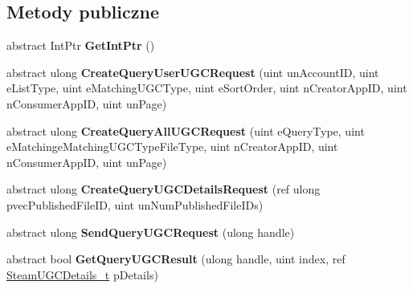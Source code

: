 \subsection*{Metody publiczne}
\begin{DoxyCompactItemize}
\item 
\mbox{\label{class_valve_1_1_steamworks_1_1_i_steam_u_g_c_a6354f35fd2711469cfea942f8886ebbf}} 
abstract Int\+Ptr {\bfseries Get\+Int\+Ptr} ()
\item 
\mbox{\label{class_valve_1_1_steamworks_1_1_i_steam_u_g_c_adcfb45f898276a6479ec0f0cd53c4ded}} 
abstract ulong {\bfseries Create\+Query\+User\+U\+G\+C\+Request} (uint un\+Account\+ID, uint e\+List\+Type, uint e\+Matching\+U\+G\+C\+Type, uint e\+Sort\+Order, uint n\+Creator\+App\+ID, uint n\+Consumer\+App\+ID, uint un\+Page)
\item 
\mbox{\label{class_valve_1_1_steamworks_1_1_i_steam_u_g_c_a7244207ccb170f9024987de342d49ff2}} 
abstract ulong {\bfseries Create\+Query\+All\+U\+G\+C\+Request} (uint e\+Query\+Type, uint e\+Matchinge\+Matching\+U\+G\+C\+Type\+File\+Type, uint n\+Creator\+App\+ID, uint n\+Consumer\+App\+ID, uint un\+Page)
\item 
\mbox{\label{class_valve_1_1_steamworks_1_1_i_steam_u_g_c_a2d56ea26dd0132ce857ca82b0bb604d6}} 
abstract ulong {\bfseries Create\+Query\+U\+G\+C\+Details\+Request} (ref ulong pvec\+Published\+File\+ID, uint un\+Num\+Published\+File\+I\+Ds)
\item 
\mbox{\label{class_valve_1_1_steamworks_1_1_i_steam_u_g_c_afc4e4e5f52ea628c0a80e1ea361a6933}} 
abstract ulong {\bfseries Send\+Query\+U\+G\+C\+Request} (ulong handle)
\item 
\mbox{\label{class_valve_1_1_steamworks_1_1_i_steam_u_g_c_a5eaaa1368abb8d890874ebc2a6d942f1}} 
abstract bool {\bfseries Get\+Query\+U\+G\+C\+Result} (ulong handle, uint index, ref \hyperlink{struct_valve_1_1_steamworks_1_1_steam_u_g_c_details__t}{Steam\+U\+G\+C\+Details\+\_\+t} p\+Details)
\item 

\end{DoxyCompactItemize}
